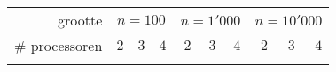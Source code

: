 \begin{tabular}{r|rrr|rrr|rrr}
\toprule
grootte&\multicolumn{3}{c|}{$n=100$}&\multicolumn{3}{c|}{$n=1'000$}&\multicolumn{3}{c|}{$n=10'000$}\\
\# processoren&$2$&$3$&$4$&$2$&$3$&$4$&$2$&$3$&$4$\\\midrule
\\\bottomrule
\end{tabular}
